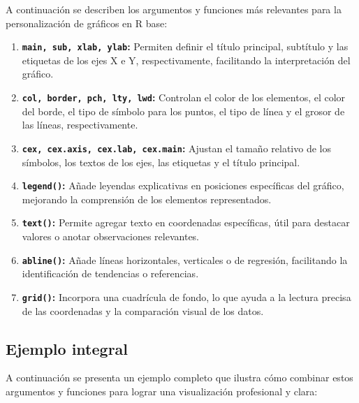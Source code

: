 \documentclass[
  spanish,
  a4paper,
  DIV=11,
  numbers=noendperiod,
  onepage,
  openany]{scrreprt}
\begin{document}
A continuación se describen los argumentos y funciones más relevantes
para la personalización de gráficos en R base:

\begin{enumerate}
\def\labelenumi{\arabic{enumi}.}
\item
  \textbf{\texttt{main,\ sub,\ xlab,\ ylab}:} Permiten definir el título
  principal, subtítulo y las etiquetas de los ejes X e Y,
  respectivamente, facilitando la interpretación del gráfico.
\item
  \textbf{\texttt{col,\ border,\ pch,\ lty,\ lwd}:} Controlan el color
  de los elementos, el color del borde, el tipo de símbolo para los
  puntos, el tipo de línea y el grosor de las líneas, respectivamente.
\item
  \textbf{\texttt{cex,\ cex.axis,\ cex.lab,\ cex.main}:} Ajustan el
  tamaño relativo de los símbolos, los textos de los ejes, las etiquetas
  y el título principal.
\item
  \textbf{\texttt{legend()}:} Añade leyendas explicativas en posiciones
  específicas del gráfico, mejorando la comprensión de los elementos
  representados.
\item
  \textbf{\texttt{text()}:} Permite agregar texto en coordenadas
  específicas, útil para destacar valores o anotar observaciones
  relevantes.
\item
  \textbf{\texttt{abline()}:} Añade líneas horizontales, verticales o de
  regresión, facilitando la identificación de tendencias o referencias.
\item
  \textbf{\texttt{grid()}:} Incorpora una cuadrícula de fondo, lo que
  ayuda a la lectura precisa de las coordenadas y la comparación visual
  de los datos.
\end{enumerate}

\subsection{Ejemplo integral}\label{ejemplo-integral}

A continuación se presenta un ejemplo completo que ilustra cómo combinar
estos argumentos y funciones para lograr una visualización profesional y
clara:
\end{document}
